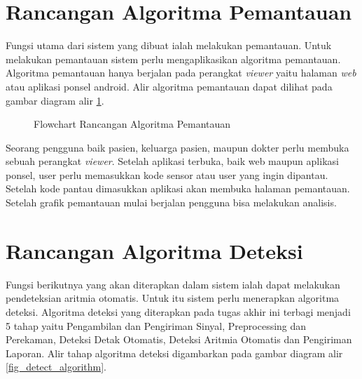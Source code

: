 \section{Rancangan Algoritma Pemantauan} \label{ssec:algorithm_design_1}
Fungsi utama dari sistem yang dibuat ialah melakukan pemantauan. Untuk melakukan pemantauan sistem perlu mengaplikasikan algoritma pemantauan. Algoritma pemantauan hanya berjalan pada perangkat \textit{viewer} yaitu halaman \textit{web} atau aplikasi ponsel android. Alir algoritma pemantauan dapat dilihat pada gambar diagram alir \ref{fig_report_algorithm}.
\begin{figure}[H]
	\centering
    \caption{Flowchart Rancangan Algoritma Pemantauan}
	\label{fig_report_algorithm}
\end{figure}

Seorang pengguna baik pasien, keluarga pasien, maupun dokter perlu membuka sebuah perangkat \textit{viewer}. Setelah aplikasi terbuka, baik web maupun aplikasi ponsel, user perlu memasukkan kode sensor atau user yang ingin dipantau. Setelah kode pantau dimasukkan aplikasi akan membuka halaman pemantauan. Setelah grafik pemantauan mulai berjalan pengguna bisa melakukan analisis.

\section{Rancangan Algoritma Deteksi} \label{ssec:algorithm_design_2}
Fungsi berikutnya yang akan diterapkan dalam sistem ialah dapat melakukan pendeteksian aritmia otomatis. Untuk itu sistem perlu menerapkan algoritma deteksi. Algoritma deteksi yang diterapkan pada tugas akhir ini terbagi menjadi 5 tahap yaitu Pengambilan dan Pengiriman Sinyal, Preprocessing dan Perekaman, Deteksi Detak Otomatis, Deteksi Aritmia Otomatis dan Pengiriman Laporan. Alir tahap algoritma deteksi digambarkan pada gambar diagram alir \ref{fig_detect_algorithm}.

